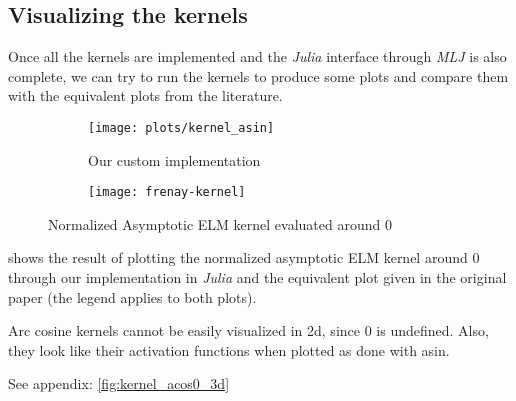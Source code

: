 
\subsection{Visualizing the kernels}

Once all the kernels are implemented and the \emph{Julia} interface through
\emph{MLJ} is also complete, we can try to run the kernels to produce some
plots and compare them with the equivalent plots from the literature.

\begin{figure}[H]
    \begin{subfigure}{.59\textwidth}
        \texttt{[image: plots/kernel\_asin]}
        \caption{Our custom implementation}
    \end{subfigure} \begin{subfigure}{.40\textwidth}
        \texttt{[image: frenay-kernel]}
        \caption{\textcite{frenayParameterinsensitiveKernelExtreme2011}}
    \end{subfigure}
    \caption{Normalized Asymptotic ELM kernel evaluated around 0}
    \label{fig:kernel_asin_comparison}
\end{figure}

 shows the result of plotting the normalized
asymptotic ELM kernel around 0 through our implementation in \emph{Julia} and
the equivalent plot given in the original paper (the legend applies to both
plots).

\begin{cnote}
    Arc cosine kernels cannot be easily visualized in 2d, since 0 is undefined.
    Also, they look like their activation functions when plotted as done
    with asin.

    See appendix: \cref{fig:kernel_acos0_3d}
\end{cnote}

%
%


